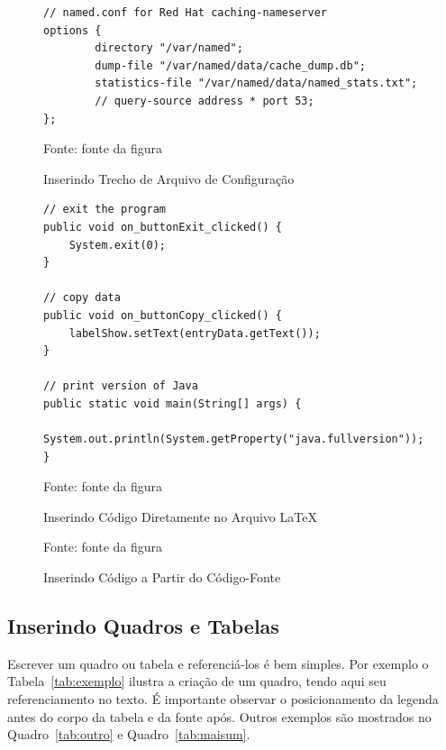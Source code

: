 \begin{figure}[!htb]
\centering
\caption{Inserindo Trecho de Arquivo de Configuração} %
\begin{Verbatim}[frame=single]
// named.conf for Red Hat caching-nameserver
options {
        directory "/var/named";
        dump-file "/var/named/data/cache_dump.db";
        statistics-file "/var/named/data/named_stats.txt";
        // query-source address * port 53;
};
\end{Verbatim} 
{\small Fonte: fonte da figura} %
\label{fig:exemploconfig} %
\end{figure}


\begin{figure}[!htb]
\centering
\caption{Inserindo Código Diretamente no Arquivo \LaTeX} %
\begin{lstlisting}
// exit the program
public void on_buttonExit_clicked() {
	System.exit(0);
}

// copy data
public void on_buttonCopy_clicked() {
	labelShow.setText(entryData.getText());
}

// print version of Java
public static void main(String[] args) {
	System.out.println(System.getProperty("java.fullversion"));
}
\end{lstlisting} 
{\small Fonte: fonte da figura} %
\label{fig:exemplocodigo1} %
\end{figure}


\begin{figure}[H]
\centering
\caption{Inserindo Código a Partir do Código-Fonte} %
\label{fig:exemplocodigo2} %

{\small Fonte: fonte da figura} %
\end{figure}

\subsection{Inserindo Quadros e Tabelas}

Escrever um quadro ou tabela e referenciá-los é bem simples. Por exemplo o Tabela~\ref{tab:exemplo} ilustra a criação de um quadro, tendo aqui seu referenciamento no texto. É importante observar o posicionamento da legenda antes do corpo da tabela e da fonte após. Outros exemplos são mostrados no Quadro~\ref{tab:outro} e Quadro~\ref{tab:maisum}.


